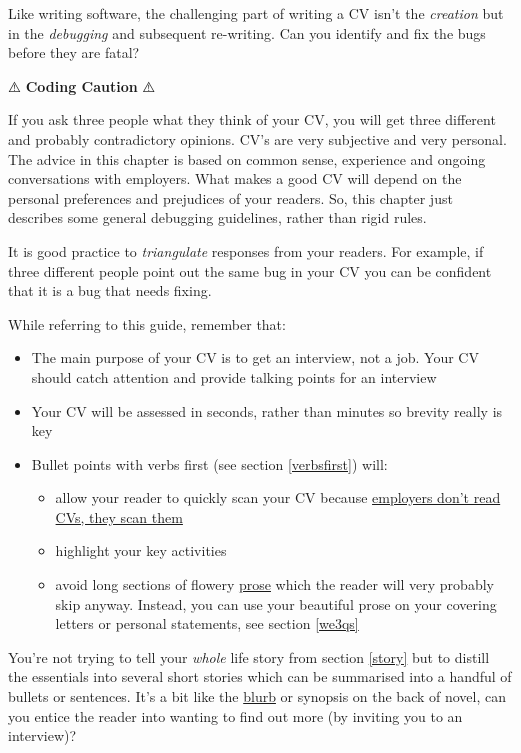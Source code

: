 \documentclass[
]{book}
\providecommand{\tightlist}{%
  \setlength{\itemsep}{0pt}\setlength{\parskip}{0pt}}
\begin{document}
Like writing software, the challenging part of writing a CV isn't the \emph{creation} but in the \emph{debugging} and subsequent re-writing. Can you identify and fix the bugs before they are fatal?

⚠️ \textbf{Coding Caution} ⚠️

If you ask three people what they think of your CV, you will get three different and probably contradictory opinions. CV's are very subjective and very personal. The advice in this chapter is based on common sense, experience and ongoing conversations with employers. What makes a good CV will depend on the personal preferences and prejudices of your readers. So, this chapter just describes some general debugging guidelines, rather than rigid rules.

It is good practice to \emph{triangulate} responses from your readers. For example, if three different people point out the same bug in your CV you can be confident that it is a bug that needs fixing.

While referring to this guide, remember that:

\begin{itemize}
\tightlist
\item
  The main purpose of your CV is to get an interview, not a job. Your CV should catch attention and provide talking points for an interview
\item
  Your CV will be assessed in seconds, rather than minutes so brevity really is key
\item
  Bullet points with verbs first (see section \ref{verbsfirst}) will:

  \begin{itemize}
  \tightlist
  \item
    allow your reader to quickly scan your CV because \href{https://readabilityguidelines.co.uk/content-design/how-people-read/}{employers don't read CVs, they scan them} \citep{scanning}
  \item
    highlight your key activities
  \item
    avoid long sections of flowery \href{https://en.wikipedia.org/wiki/Prose}{prose} which the reader will very probably skip anyway. Instead, you can use your beautiful prose on your covering letters or personal statements, see section \ref{we3qs}
  \end{itemize}
\end{itemize}

You're not trying to tell your \emph{whole} life story from section \ref{story} but to distill the essentials into several short stories which can be summarised into a handful of bullets or sentences. It's a bit like the \href{https://en.wikipedia.org/wiki/Blurb}{blurb} or synopsis on the back of novel, can you entice the reader into wanting to find out more (by inviting you to an interview)?
\end{document}
